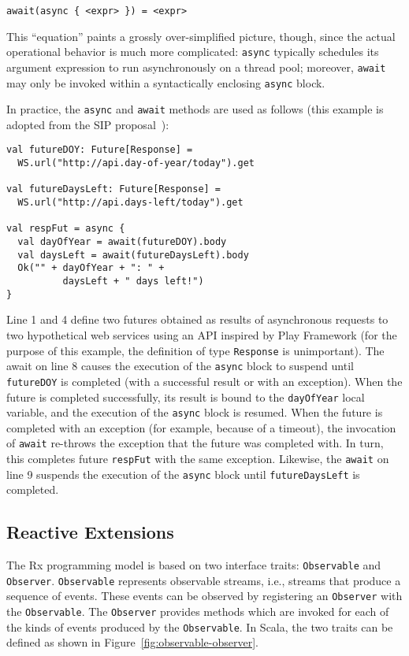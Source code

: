 \documentclass{acm_proc_article-sp}
\begin{document}
\begin{lstlisting}
await(async { <expr> }) = <expr>
\end{lstlisting}

This ``equation'' paints a grossly over-simplified picture, though, since the
actual operational behavior is much more complicated: \verb|async| typically
schedules its argument expression to run asynchronously on a thread pool;
moreover, \verb|await| may only be invoked within a syntactically enclosing
\verb|async| block.

In practice, the \verb|async| and \verb|await| methods are used as follows
(this example is adopted from the SIP proposal~\cite{ScalaAsyncSIP}):

\lstset{numbers=left,xleftmargin=2em}
\begin{lstlisting}
val futureDOY: Future[Response] =
  WS.url("http://api.day-of-year/today").get

val futureDaysLeft: Future[Response] =
  WS.url("http://api.days-left/today").get

val respFut = async {
  val dayOfYear = await(futureDOY).body
  val daysLeft = await(futureDaysLeft).body
  Ok("" + dayOfYear + ": " +
          daysLeft + " days left!")
}
\end{lstlisting}

Line 1 and 4 define two futures obtained as results of asynchronous requests
to two hypothetical web services using an API inspired by Play Framework (for
the purpose of this example, the definition of type \verb|Response| is
unimportant). The await on line 8 causes the execution of the \verb|async|
block to suspend until \verb|futureDOY| is completed (with a successful result
or with an exception). When the future is completed successfully, its result
is bound to the \verb|dayOfYear| local variable, and the execution of the
\verb|async| block is resumed. When the future is completed with an exception
(for example, because of a timeout), the invocation of \verb|await| re-throws
the exception that the future was completed with. In turn, this completes
future \verb|respFut| with the same exception. Likewise, the \verb|await| on
line 9 suspends the execution of the \verb|async| block until
\verb|futureDaysLeft| is completed.


\subsection{Reactive Extensions}

The Rx programming model is based on two interface traits: \verb|Observable|
and \verb|Observer|. \verb|Observable| represents observable streams, i.e.,
streams that produce a sequence of events. These events can be observed by
registering an \verb|Observer| with the \verb|Observable|. The \verb|Observer|
provides methods which are invoked for each of the kinds of events produced by
the \verb|Observable|. In Scala, the two traits can be defined as shown in
Figure~\ref{fig:observable-observer}.
\end{document}
